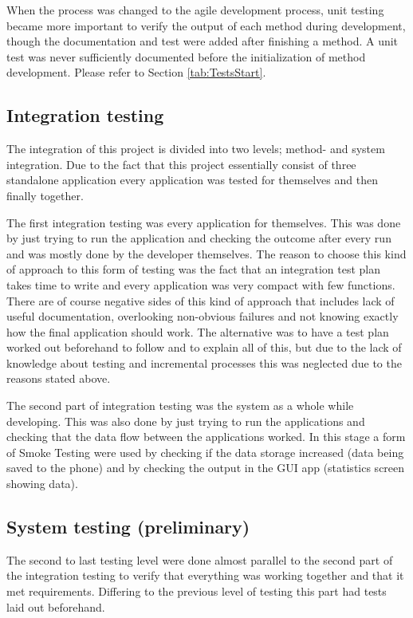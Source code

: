 When the process was changed to the agile development process, unit testing became more important to verify the output of each method during development, though the documentation and test were added after finishing a method. A unit test was never sufficiently documented before the initialization of method development. Please refer to Section \ref{tab:TestsStart}.
\subsection{Integration testing}
The integration of this project is divided into two levels; method- and system integration. Due to the fact that this project essentially consist of three standalone application every application was tested for themselves and then finally together.

The first integration testing was every application for themselves. This was done by just trying to run the application and checking the outcome after every run and was mostly done by the developer themselves. The reason to choose this kind of approach to this form of testing was the fact that an integration test plan takes time to write and every application was very compact with few functions. There are of course negative sides of this kind of approach that includes lack of useful documentation, overlooking non-obvious failures and not knowing exactly how the final application should work. The alternative was to have a test plan worked out beforehand to follow and to explain all of this, but due to the lack of knowledge about testing and incremental processes this was neglected due to the reasons stated above.

The second part of integration testing was the system as a whole while developing. This was also done by just trying to run the applications and checking that the data flow between the applications worked. In this stage a form of Smoke Testing were used by checking if the data storage increased (data being saved to the phone) and by checking the output in the GUI app (statistics screen showing data).
\subsection{System testing (preliminary)} %
The second to last testing level were done almost parallel to the second part of the integration testing to verify that everything was working together and that it met requirements. Differing to the previous level of testing this part had tests laid out beforehand.

